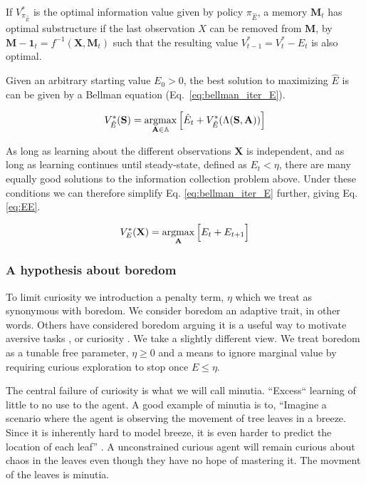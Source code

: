 \begin{theorem} \label{theorem:opt_sub} 
   If $V^*_{\pi_{\hat E}}$ is the optimal information value given by policy $\pi_{\hat E}$, a memory $\mathbf{M}_t$ has optimal substructure if the last observation $X$ can be removed from $\mathbf{M}$, by $\mathbf{M-1}_{t} = f^{-1}(\mathbf{X}, \mathbf{M}_t)$ such that the resulting value $V^*_{t-1} = V^*_{t} - E_{t}$ is also optimal. 
\end{theorem}

Given an arbitrary starting value $E_0 > 0$, the best solution to maximizing $\hat E$ is can be given by a Bellman equation (Eq.~\ref{eq:bellman_iter_E}).

\begin{equation} 
	\label{eq:bellman_iter_E}
	V^*_{\hat E}(\mathbf{S}) = \operatorname*{argmax}_{\mathbf{A} \in \mathbb{A}} \Big [ \hat E_{t}  + V^*_{\hat E}(\Lambda(\mathbf{S},\mathbf{A})) \Big ]
\end{equation}

As long as learning about the different observations $\mathbf{X}$ is independent, and as long as learning continues until steady-state, defined as $E_t < \eta$, there are many equally good solutions to the information collection problem above. Under these conditions we can therefore simplify Eq. \ref{eq:bellman_iter_E} further, giving Eq. \ref{eq:EE}. 

\begin{equation}
	\label{eq:EE} 
	V_E^{*}(\mathbf{X}) = \operatorname*{argmax}_{\mathbf{A}} \Big [ E_t + E_{t+1} \Big ]
\end{equation}

\subsubsection*{A hypothesis about boredom}
To limit curiosity we introduction a penalty term, $\eta$ which we treat as synonymous with boredom. We consider boredom an adaptive trait, in other words. Others have considered boredom arguing it is a useful way to motivate aversive tasks \cite{Bench2013}, or curiosity \cite{Loewenstein1994}. We take a slightly different view. We treat boredom as a tunable free parameter, $\eta \ge 0$ and a means to ignore marginal value by requiring curious exploration to stop once $E \le \eta$. 

The central failure of curiosity is what we will call minutia. ``Excess`` learning of little to no use to the agent. A good example of minutia is to, ``Imagine a scenario where the agent is observing the movement of tree leaves in a breeze. Since it is inherently hard to model breeze, it is even harder to predict the location of each leaf'' \cite{Pathak2017}. A unconstrained curious agent will remain curious about chaos in the leaves even though they have no hope of mastering it. The movment of the leaves is minutia.


